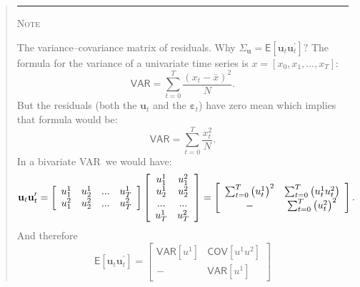 \documentclass[11pt,a4paper]{report}
\numberwithin{equation}{chapter}
\numberwithin{section}{chapter}
\begin{document}
%
\begin{quotation}
\noindent \rule{1cm}{.4pt}   {\scshape Note}   \hrulefill
\vspace{-.36cm}

\noindent \hrulefill
\small
\singlespacing
\color{note}\sffamily%

The variance--covariance matrix of residuals. Why $\Sigma _{\mathbf{u}}=%
\mathsf{E}\left[ \mathbf{u}_{t}\mathbf{u}_{t}^{\prime }\right] ?$ The
formula for the variance of a univariate time series is $%
x=[x_{0},x_{1},...,x_{T}]:$%
\begin{equation*}
\mathsf{VAR}=\sum_{t=0}^{T}\frac{\left( x_{t}-\bar{x}\right) ^{2}}{N}.
\end{equation*}%
But the residuals (both the $\mathbf{u}_{t}$ and the $\mathbf{\varepsilon }%
_{t}$) have zero mean which implies that formula would be: 
\begin{equation*}
\mathsf{VAR}=\sum_{t=0}^{T}\frac{x_{t}^{2}}{N}.
\end{equation*}%
In a bivariate VAR\ we would have:%
\begin{equation*}
\mathbf{u}_{t}\mathbf{u}_{t}^{\prime }=\left[ 
\begin{array}{cccc}
{\footnotesize u}_{1}^{1} & {\footnotesize u}_{2}^{1} & {\footnotesize ...}
& {\footnotesize u}_{T}^{1} \\ 
{\footnotesize u}_{1}^{2} & {\footnotesize u}_{2}^{2} & {\footnotesize ...}
& {\footnotesize u}_{T}^{2}%
\end{array}%
\right] \left[ 
\begin{array}{cc}
{\footnotesize u}_{1}^{1} & {\footnotesize u}_{1}^{2} \\ 
{\footnotesize u}_{2}^{1} & {\footnotesize u}_{2}^{2} \\ 
{\footnotesize ...} & {\footnotesize ...} \\ 
{\footnotesize u}_{T}^{1} & {\footnotesize u}_{T}^{2}%
\end{array}%
\right] =\left[ 
\begin{array}{cc}
\sum_{t=0}^{T}\left( u_{t}^{1}\right) ^{2} & \sum_{t=0}^{T}\left(
u_{t}^{1}u_{t}^{2}\right) \\ 
- & \sum_{t=0}^{T}\left( u_{t}^{2}\right) ^{2}%
\end{array}%
\right] .
\end{equation*}%
And therefore 
\begin{equation*}
\mathsf{E}\left[ \mathbf{u}_{t}\mathbf{u}_{t}^{\prime }\right] =\left[ 
\begin{array}{cc}
\mathsf{VAR}\left[ u^{1}\right] & \mathsf{COV}\left[ u^{1}u^{2}\right] \\ 
- & \mathsf{VAR}\left[ u^{1}\right]%
\end{array}%
\right]
\end{equation*}


\end{quotation}
\end{document}
